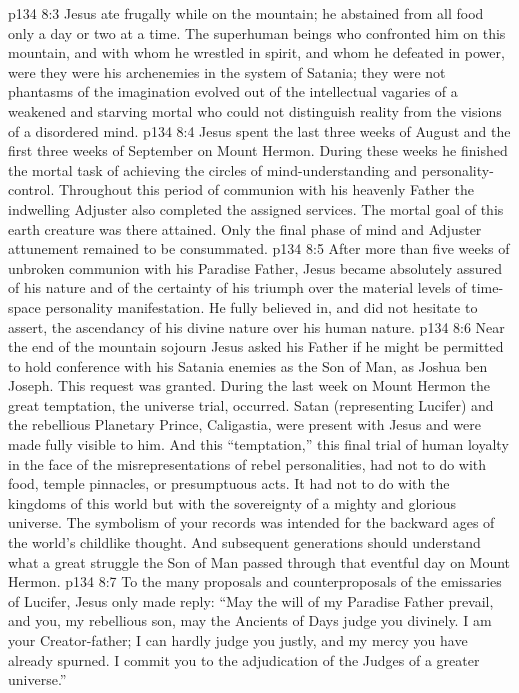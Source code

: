 \pc \vs p134 8:3 Jesus ate frugally while on the mountain; he abstained from all food only a day or two at a time. The superhuman beings who confronted him on this mountain, and with whom he wrestled in spirit, and whom he defeated in power, were  they were his archenemies in the system of Satania; they were not phantasms of the imagination evolved out of the intellectual vagaries of a weakened and starving mortal who could not distinguish reality from the visions of a disordered mind.
\vs p134 8:4 Jesus spent the last three weeks of August and the first three weeks of September on Mount Hermon. During these weeks he finished the mortal task of achieving the circles of mind\hyp{}understanding and personality\hyp{}control. Throughout this period of communion with his heavenly Father the indwelling Adjuster also completed the assigned services. The mortal goal of this earth creature was there attained. Only the final phase of mind and Adjuster attunement remained to be consummated.
\vs p134 8:5 After more than five weeks of unbroken communion with his Paradise Father, Jesus became absolutely assured of his nature and of the certainty of his triumph over the material levels of time\hyp{}space personality manifestation. He fully believed in, and did not hesitate to assert, the ascendancy of his divine nature over his human nature.
\pc \vs p134 8:6 Near the end of the mountain sojourn Jesus asked his Father if he might be permitted to hold conference with his Satania enemies as the Son of Man, as Joshua ben Joseph. This request was granted. During the last week on Mount Hermon the great temptation, the universe trial, occurred. Satan (representing Lucifer) and the rebellious Planetary Prince, Caligastia, were present with Jesus and were made fully visible to him. And this “temptation,” this final trial of human loyalty in the face of the misrepresentations of rebel personalities, had not to do with food, temple pinnacles, or presumptuous acts. It had not to do with the kingdoms of this world but with the sovereignty of a mighty and glorious universe. The symbolism of your records was intended for the backward ages of the world’s childlike thought. And subsequent generations should understand what a great struggle the Son of Man passed through that eventful day on Mount Hermon.
\vs p134 8:7 To the many proposals and counterproposals of the emissaries of Lucifer, Jesus only made reply: \textcolor{ubdarkred}{“May the will of my Paradise Father prevail, and you, my rebellious son, may the Ancients of Days judge you divinely. I am your Creator\hyp{}father; I can hardly judge you justly, and my mercy you have already spurned. I commit you to the adjudication of the Judges of a greater universe.”}
